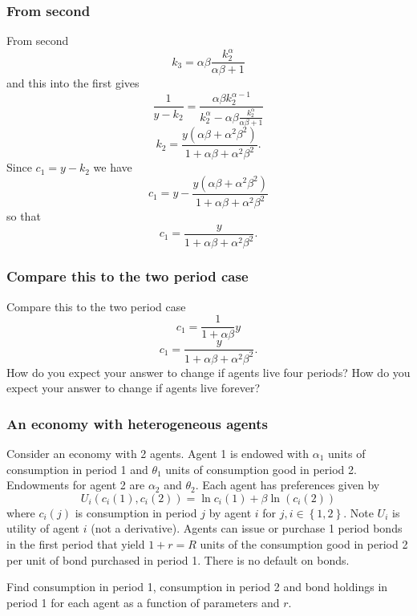 \documentclass[aspectratio=169]{ltx-talk}
\begin{document}
\begin{frame}
\frametitle{From second}
From second 
\begin{equation*}
k_{3}=\alpha \beta \frac{k_{2}^{\alpha }}{\alpha \beta +1}
\end{equation*}%
and this into the first gives 
\begin{equation*}
\frac{1}{y-k_{2}}=\frac{\alpha \beta k_{2}^{\alpha -1}}{k_{2}^{\alpha
}-\alpha \beta \frac{k_{2}^{\alpha }}{\alpha \beta +1}}
\end{equation*}%
\begin{equation*}
k_{2}=\frac{y\left( \alpha \beta +\alpha ^{2}\beta ^{2}\right) }{1+\alpha
\beta +\alpha ^{2}\beta ^{2}}.
\end{equation*}%
Since $c_{1}=y-k_{2}$ we have%
\begin{equation*}
c_{1}=y-\frac{y\left( \alpha \beta +\alpha ^{2}\beta ^{2}\right) }{1+\alpha
\beta +\alpha ^{2}\beta ^{2}}
\end{equation*}%
so that 
\begin{equation*}
c_{1}=\frac{y}{1+\alpha \beta +\alpha ^{2}\beta ^{2}}.
\end{equation*}%
\end{frame}

\begin{frame}
\frametitle{Compare this to the two period case}
Compare this to the two period case%
\begin{equation*}
c_{1}=\frac{1}{1+\alpha \beta }y
\end{equation*}%
\begin{equation*}
c_{1}=\frac{y}{1+\alpha \beta +\alpha ^{2}\beta ^{2}}.
\end{equation*}%
How do you expect your answer to change if agents live four periods?
How do you expect your answer to change if agents live forever?
\end{frame}

\begin{frame}
\frametitle{An economy with heterogeneous agents}
Consider an economy with 2 agents. Agent 1 is endowed with $\alpha _{1}$
units of consumption in period 1 and $\theta _{1}$ units of consumption good
in period 2. Endowments for agent 2 are $\alpha _{2}$ and $\theta _{2}.$
Each agent has preferences given by 
\begin{equation*}
U_{i}\left( c_{i}\left( 1\right) ,c_{i}\left( 2\right) \right) =\ln
c_{i}\left( 1\right) +\beta \ln \left( c_{i}\left( 2\right) \right)
\end{equation*}%
where $c_{i}\left( j\right) $ is consumption in period $j$ by agent $i$ for $%
j,i\in \left\{ 1,2\right\} .$ Note $U_{i}$ is utility of agent $i$ (not a
derivative). Agents can issue or purchase 1 period bonds in the first period
that yield $1+r=R$ units of the consumption good in period 2 per unit of
bond purchased in period 1. There is no default on bonds.

Find consumption in period 1, consumption in period 2 and bond holdings in
period 1 for each agent as a function of parameters and $r.$\newline
\end{frame}
\end{document}
